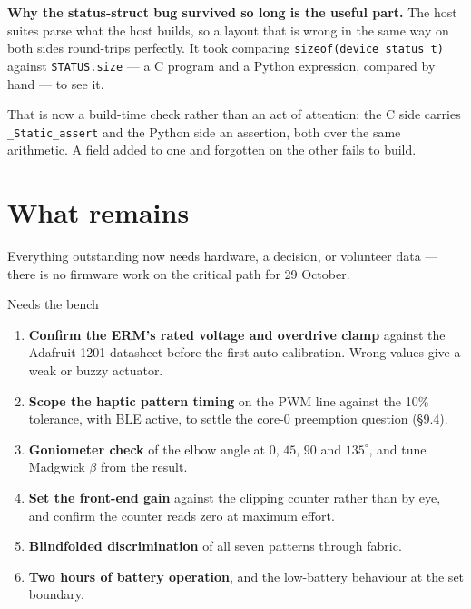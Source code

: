 \documentclass[11pt]{article}
\begin{document}
\begin{callout}
\textbf{Why the status-struct bug survived so long is the useful part.} The
host suites parse what the host builds, so a layout that is wrong in the same
way on both sides round-trips perfectly. It took comparing
\texttt{sizeof(device\_status\_t)} against \texttt{STATUS.size} --- a C
program and a Python expression, compared by hand --- to see it.

\medskip
That is now a build-time check rather than an act of attention: the C side
carries \texttt{\_Static\_assert} and the Python side an assertion, both over
the same arithmetic. A field added to one and forgotten on the other fails to
build.
\end{callout}

\section{What remains}

Everything outstanding now needs hardware, a decision, or volunteer data ---
there is no firmware work on the critical path for 29 October.

\begin{phasebox}{Needs the bench}
\begin{enumerate}
\item \textbf{Confirm the ERM's rated voltage and overdrive clamp} against the
Adafruit 1201 datasheet before the first auto-calibration. Wrong values give a
weak or buzzy actuator.
\item \textbf{Scope the haptic pattern timing} on the PWM line against the
10\% tolerance, with BLE active, to settle the core-0 preemption question
(\S9.4).
\item \textbf{Goniometer check} of the elbow angle at $0$, $45$, $90$ and
$135^{\circ}$, and tune Madgwick $\beta$ from the result.
\item \textbf{Set the front-end gain} against the clipping counter rather than
by eye, and confirm the counter reads zero at maximum effort.
\item \textbf{Blindfolded discrimination} of all seven patterns through
fabric.
\item \textbf{Two hours of battery operation}, and the low-battery behaviour
at the set boundary.
\end{enumerate}
\end{phasebox}
\end{document}

